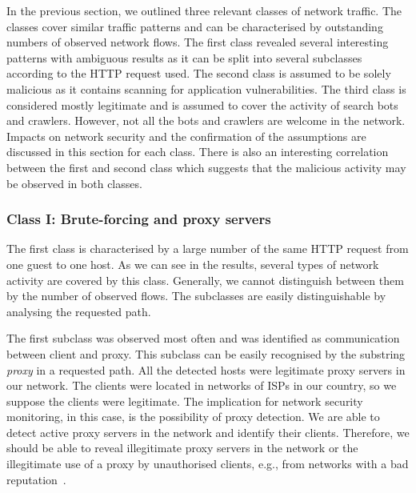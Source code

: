 In the previous section, we outlined three relevant classes of network traffic. The classes cover similar traffic patterns and can be characterised by outstanding numbers of observed network flows. The first class revealed several interesting patterns with ambiguous results as it can be split into several subclasses according to the HTTP request used. The second class is assumed to be solely malicious as it contains scanning for application vulnerabilities. The third class is considered mostly legitimate and is assumed to cover the activity of search bots and crawlers. However, not all the bots and crawlers are welcome in the network. Impacts on network security and the confirmation of the assumptions are discussed in this section for each class. There is also an interesting correlation between the first and second class which suggests that the malicious activity may be observed in both classes.

\subsubsection{Class I: Brute-forcing and proxy servers}

The first class is characterised by a large number of the same HTTP request from one guest to one host. As we can see in the results, several types of network activity are covered by this class. Generally, we cannot distinguish between them by the number of observed flows. The subclasses are easily distinguishable by analysing the requested path.

The first subclass was observed most often and was identified as communication between client and proxy. This subclass can be easily recognised by the substring \textit{proxy} in a requested path. All the detected hosts were legitimate proxy servers in our network. The clients were located in networks of ISPs in our country, so we suppose the clients were legitimate. The implication for network security monitoring, in this case, is the possibility of proxy detection. We are able to detect active proxy servers in the network and identify their clients. Therefore, we should be able to reveal illegitimate proxy servers in the network or the illegitimate use of a proxy by unauthorised clients, e.g., from networks with a bad reputation~\cite{MoreiraMoura-2013-Internet}.


